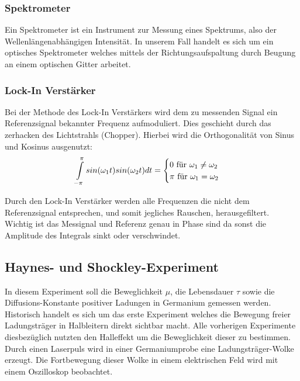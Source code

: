 \documentclass[12pt]{article}
\begin{document}
\subsubsection{Spektrometer}
Ein Spektrometer ist ein Instrument zur Messung eines Spektrums, also der Wellenlängenabhängigen Intensität. In unserem Fall handelt es sich um ein optisches Spektrometer welches mittels der Richtungsaufspaltung durch Beugung an einem optischen Gitter arbeitet.

\subsubsection{Lock-In Verstärker}
Bei der Methode des Lock-In Verstärkers wird dem zu messenden Signal ein Referenzsignal bekannter Frequenz aufmoduliert.
Dies geschieht durch das zerhacken des Lichtstrahls (Chopper). Hierbei wird die Orthogonalität von
Sinus und Kosinus ausgenutzt:
\begin{align}
 \int \limits_{-\pi} \limits^{\pi} sin(\omega_1 t)sin(\omega_2 t) dt = \begin{cases} 0 \textnormal{ für } \omega_1\neq\omega_2\\ \pi \textnormal{ für } \omega_1 = \omega_2\end{cases}
\end{align}

Durch den Lock-In Verstärker werden alle Frequenzen die nicht dem Referenzsignal entsprechen, und somit jegliches Rauschen, herausgefiltert. \\

Wichtig ist das Messignal und Referenz genau in Phase sind da sonst die Amplitude des Integrals sinkt oder verschwindet.

\subsection{Haynes- und Shockley-Experiment}

In diesem Experiment soll die Beweglichkeit $\mu$, die Lebensdauer $\tau$ sowie die Diffusions-Konstante positiver Ladungen in Germanium gemessen werden. Historisch handelt es sich um das erste Experiment welches die Bewegung freier Ladungsträger in Halbleitern direkt sichtbar macht. Alle vorherigen Experimente diesbezüglich nutzten den Halleffekt um die Beweglichkeit dieser zu bestimmen.
Durch einen Laserpuls wird in einer Germaniumprobe eine Ladungsträger-Wolke erzeugt. Die Fortbewegung dieser Wolke in einem elektrischen Feld wird mit einem Oszilloskop beobachtet.
\end{document}
